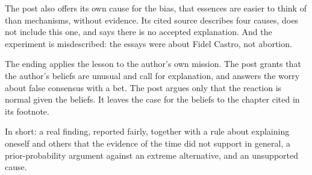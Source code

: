 \begin{afterword}
The post also offers its own cause for the bias, that essences are easier to think of than mechanisms, without evidence. Its cited source describes four causes, does not include this one, and says there is no accepted explanation. And the experiment is misdescribed: the essays were about Fidel Castro, not abortion.

The ending applies the lesson to the author's own mission. The post grants that the author's beliefs are unusual and call for explanation, and answers the worry about false consensus with a bet. The post argues only that the reaction is normal given the beliefs. It leaves the case for the beliefs to the chapter cited in its footnote.

In short: a real finding, reported fairly, together with a rule about explaining oneself and others that the evidence of the time did not support in general, a prior-probability argument against an extreme alternative, and an unsupported cause.
\end{afterword}
